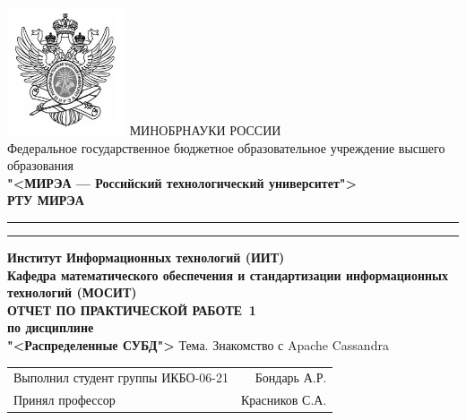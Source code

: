 \begin{titlepage}
	\thispagestyle{fancy}
	\renewcommand{\headrulewidth}{0pt}

	\centering
	\includegraphics[scale=0.5]{../res/logo} \break %
	МИНОБРНАУКИ РОССИИ\\
	Федеральное государственное бюджетное образовательное учреждение
	высшего образования\\
	\textbf{"<МИРЭА --- Российский технологический университет">}\\
	\textbf{РТУ МИРЭА}\\
	\bigskip \hrule \smallskip \hrule
	\vfill
	\vfill
	\textbf{Институт Информационных технологий (ИИТ)}\\
	\textbf{Кафедра математического обеспечения
		и стандартизации информационных технологий (МОСИТ)}\\
	\vfill
	\vfill
	\textbf{ОТЧЕТ ПО ПРАКТИЧЕСКОЙ РАБОТЕ \No\,1}\\
	\textbf{по дисциплине}\\
	\textbf{"<Распределенные СУБД">}
	\vfill
	Тема. Знакомство с Apache Cassandra
	\vfill
	\vfill
	\vfill
	\begin{tabular}{lr}
		Выполнил студент группы ИКБО-06-21 & Бондарь А.Р.\\
		Принял профессор & Красников С.А.\\
	\end{tabular}
	\vfill
	\vfill
	\vfill
\end{titlepage}
\setcounter{page}{2}
\clearpage

